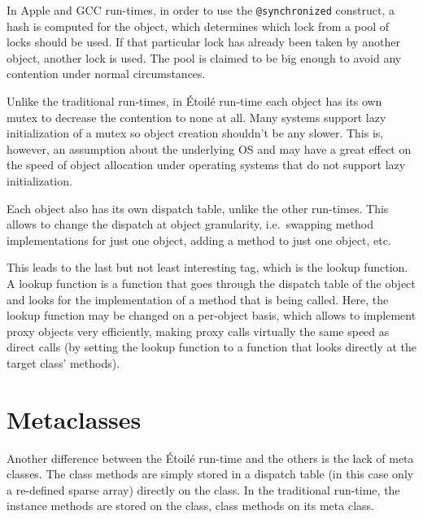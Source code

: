In Apple and GCC run-times, in order to use the \verb=@synchronized= construct, a hash is computed for the object, which determines which lock from a pool of locks should be used. If that particular lock has already been taken by another object, another lock is used. The pool is claimed to be big enough to avoid any contention under normal circumstances. 

Unlike the traditional run-times, in \'Etoil\'e run-time each object has its own mutex to decrease the contention to none at all. Many systems support lazy initialization of a mutex so object creation shouldn't be any slower. This is, however, an assumption about the underlying OS and may have a great effect on the speed of object allocation under operating systems that do not support lazy initialization.

Each object also has its own dispatch table, unlike the other run-times. This allows to change the dispatch at object granularity, i.e.\ swapping method implementations for just one object, adding a method to just one object, etc.

This leads to the last but not least interesting tag, which is the lookup function. A lookup function is a function that goes through the dispatch table of the object and looks for the implementation of a method that is being called. Here, the lookup function may be changed on a per-object basis, which allows to implement proxy objects very efficiently, making proxy calls virtually the same speed as direct calls (by setting the lookup function to a function that looks directly at the target class' methods).

\section{Metaclasses}

Another difference between the \'Etoil\'e run-time and the others is the lack of meta classes. The class methods are simply stored in a dispatch table (in this case only a re-defined sparse array) directly on the class. In the traditional run-time, the instance methods are stored on the class, class methods on its meta class.

